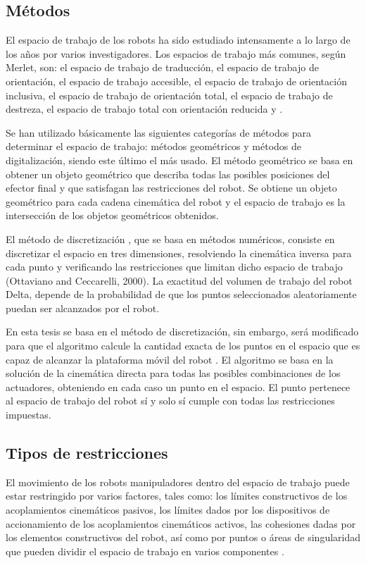     \newpage
    
    \subsection{Métodos}
    
    El espacio de trabajo de los robots ha sido estudiado intensamente a lo largo de los años por varios investigadores. Los espacios de trabajo más comunes, según Merlet, son: el espacio de trabajo de traducción, el espacio de trabajo de orientación, el espacio de trabajo accesible, el espacio de trabajo de orientación inclusiva, el espacio de trabajo de orientación total, el espacio de trabajo de destreza, el espacio de trabajo total con orientación reducida \cite{Laribi08} y \cite{AFFI2004311}.
    
    Se han utilizado básicamente las siguientes categorías de métodos para determinar el espacio de trabajo: métodos geométricos y métodos de digitalización, siendo este último el más usado.
    El método geométrico \cite{delta_Urrea} se basa en obtener un objeto geométrico que describa todas las posibles posiciones del efector final y que satisfagan las restricciones del robot. Se obtiene un objeto geométrico para cada cadena cinemática del robot y el espacio de trabajo es la intersección de los objetos geométricos obtenidos.
    
    El método de discretización \cite{delta_Urrea}, que se basa en métodos numéricos, consiste en discretizar el espacio en tres dimensiones, resolviendo la cinemática inversa para cada punto y verificando las restricciones que limitan dicho espacio de trabajo (Ottaviano and Ceccarelli, 2000). La exactitud del volumen de trabajo del robot Delta, depende de la probabilidad de que los puntos seleccionados aleatoriamente puedan ser alcanzados por el robot. 
    
    En esta tesis se basa en el método de discretización, sin embargo, será modificado para que el algoritmo calcule la cantidad exacta de los puntos en el espacio que es capaz de alcanzar la plataforma móvil del robot \cite{delta_Urrea}. El algoritmo se basa en la solución de la cinemática directa para todas las posibles combinaciones de los actuadores, obteniendo en cada caso un punto en el espacio. El punto pertenece al espacio de trabajo del robot sí y solo sí cumple con todas las restricciones impuestas.
    
    \newpage

    
    \subsection{Tipos de restricciones}\label{restriccionesWS}
    El movimiento de los robots manipuladores dentro del espacio de trabajo puede estar restringido por varios factores, tales como: los límites constructivos de los acoplamientos cinemáticos pasivos, los límites dados por los dispositivos de accionamiento de los acoplamientos cinemáticos activos, las cohesiones dadas por los elementos constructivos del robot, así como por puntos o áreas de singularidad que pueden dividir el espacio de trabajo en varios componentes \cite{Laribi08}. 
    
